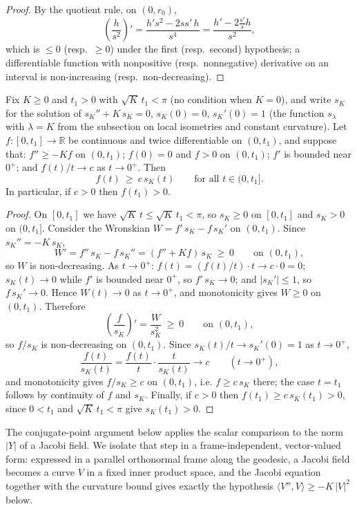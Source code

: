 \begin{proof}
\leanok
By the quotient rule, on $(0,r_0)$,
$$\left(\frac{h}{s^2}\right)'
=\frac{h's^2-2ss'\,h}{s^4}
=\frac{h'-2\frac{s'}{s}h}{s^2},$$
which is $\le0$ (resp.\ $\ge0$) under the first (resp.\ second)
hypothesis; a differentiable function with nonpositive (resp.\
nonnegative) derivative on an interval is non-increasing (resp.\
non-decreasing).
\end{proof}

\begin{lemma}
\label{lem:scalar-sturm-comparison}
\leanok
Fix $K\ge0$ and $t_1>0$ with $\sqrt K\,t_1<\pi$ (no condition when
$K=0$), and write $s_K$ for the solution of $s_K''+K\,s_K=0$,
$s_K(0)=0$, $s_K'(0)=1$ (the function $s_\lambda$ with $\lambda=K$
from the subsection on local isometries and constant curvature).
Let $f\colon[0,t_1]\to\mathbb{R}$ be continuous and twice
differentiable on $(0,t_1)$, and suppose that: $f''\ge -K f$ on
$(0,t_1)$; $f(0)=0$ and $f>0$ on $(0,t_1)$; $f'$ is bounded near
$0^+$; and $f(t)/t\to c$ as $t\to0^+$. Then
$$f(t)\ \ge\ c\,s_K(t)\qquad\text{for all }t\in(0,t_1].$$
In particular, if $c>0$ then $f(t_1)>0$.
\end{lemma}

\begin{proof}
\leanok
On $[0,t_1]$ we have $\sqrt K\,t\le\sqrt K\,t_1<\pi$, so $s_K\ge0$
on $[0,t_1]$ and $s_K>0$ on $(0,t_1]$. Consider the Wronskian
$W=f'\,s_K-f\,s_K'$ on $(0,t_1)$. Since $s_K''=-K\,s_K$,
$$W'=f''\,s_K-f\,s_K''=(f''+K f)\,s_K\ \ge\ 0\qquad
\text{on }(0,t_1),$$
so $W$ is non-decreasing. As $t\to0^+$: $f(t)=(f(t)/t)\cdot t\to
c\cdot0=0$; $s_K(t)\to0$ while $f'$ is bounded near $0^+$, so
$f'\,s_K\to0$; and $|s_K'|\le1$, so $f\,s_K'\to0$. Hence
$W(t)\to0$ as $t\to0^+$, and monotonicity gives $W\ge0$ on
$(0,t_1)$. Therefore
$$\left(\frac f{s_K}\right)'=\frac W{s_K^2}\ \ge\ 0
\qquad\text{on }(0,t_1),$$
so $f/s_K$ is non-decreasing on $(0,t_1)$. Since
$s_K(t)/t\to s_K'(0)=1$ as $t\to0^+$,
$$\frac{f(t)}{s_K(t)}=\frac{f(t)}{t}\cdot\frac{t}{s_K(t)}
\longrightarrow c\qquad(t\to0^+),$$
and monotonicity gives $f/s_K\ge c$ on $(0,t_1)$, i.e.
$f\ge c\,s_K$ there; the case $t=t_1$ follows by continuity of $f$
and $s_K$. Finally, if $c>0$ then
$f(t_1)\ge c\,s_K(t_1)>0$, since $0<t_1$ and $\sqrt K\,t_1<\pi$
give $s_K(t_1)>0$.
\end{proof}

The conjugate-point argument below applies the scalar comparison to
the norm $|Y|$ of a Jacobi field. We isolate that step in a
frame-independent, vector-valued form: expressed in a parallel
orthonormal frame along the geodesic, a Jacobi field becomes a curve
$V$ in a fixed inner product space, and the Jacobi equation together
with the curvature bound gives exactly the hypothesis
$\langle V'',V\rangle\ge-K\,|V|^2$ below.


